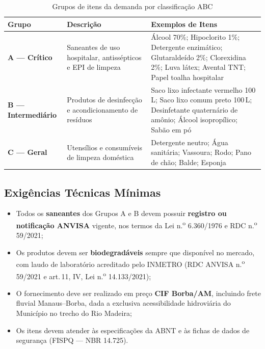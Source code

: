 \documentclass[12pt,a4paper]{article}
\begin{document}
\begin{table}[H]
\centering
\caption{Grupos de itens da demanda por classificação ABC}
\small{}
\begin{tabular}{>{\centering\arraybackslash}p{1.4cm}
                p{5.0cm}
                p{6.8cm}}
  \rowcolor{navy}
  \color{white}\textbf{Grupo} &
  \color{white}\textbf{Descrição} &
  \color{white}\textbf{Exemplos de Itens} \\
  \toprule
  \textbf{A --- Crítico} &
    Saneantes de uso hospitalar, antissépticos e EPI de limpeza &
    Álcool 70\%; Hipoclorito 1\%; Detergente enzimático; Glutaraldeído 2\%;
    Clorexidina 2\%; Luva látex; Avental TNT; Papel toalha hospitalar \\
  \textbf{B --- Intermediário} &
    Produtos de desinfecção e acondicionamento de resíduos &
    Saco lixo infectante vermelho 100\,L; Saco lixo comum preto 100\,L;
    Desinfetante quaternário de amônio; Álcool isopropílico; Sabão em pó \\
  \textbf{C --- Geral} &
    Utensílios e consumíveis de limpeza doméstica &
    Detergente neutro; Água sanitária; Vassoura; Rodo; Pano de chão; Balde; Esponja \\
  \bottomrule
\end{tabular}
\end{table}

\subsection{Exigências Técnicas Mínimas}

\begin{itemize}
  \item Todos os \textbf{saneantes} dos Grupos A e B devem possuir \textbf{registro ou
    notificação ANVISA} vigente, nos termos da Lei n.\textsuperscript{o} 6.360/1976 e
    RDC n.\textsuperscript{o} 59/2021;
  \item Os produtos devem ser \textbf{biodegradáveis} sempre que disponível no mercado,
    com laudo de laboratório acreditado pelo INMETRO (RDC ANVISA n.\textsuperscript{o}
    59/2021 e art.\,11, IV, Lei n.\textsuperscript{o} 14.133/2021);
  \item O fornecimento deve ser realizado em preço \textbf{CIF Borba/AM}, incluindo
    frete fluvial Manaus--Borba, dada a exclusiva acessibilidade hidroviária do
    Município no trecho do Rio Madeira;
  \item Os itens devem atender às especificações da ABNT e às fichas de dados de
    segurança (FISPQ --- NBR 14.725).
\end{itemize}
\end{document}
